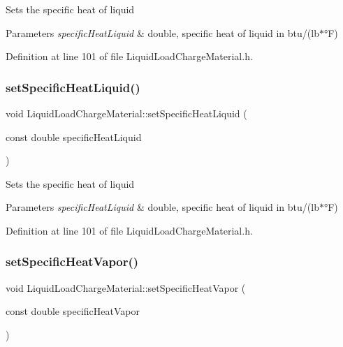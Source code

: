 Sets the specific heat of liquid 
\begin{DoxyParams}{Parameters}
{\em specific\+Heat\+Liquid} & double, specific heat of liquid in btu/(lb$\ast$°F) \\
\hline
\end{DoxyParams}


Definition at line 101 of file Liquid\+Load\+Charge\+Material.\+h.

\mbox{\label{class_liquid_load_charge_material_a2187c4c6ba394c05ab42e769bf175683}} 
\subsubsection{\texorpdfstring{set\+Specific\+Heat\+Liquid()}{setSpecificHeatLiquid()}\hspace{0.1cm}{\footnotesize\ttfamily [3/3]}}
{\footnotesize\ttfamily void Liquid\+Load\+Charge\+Material\+::set\+Specific\+Heat\+Liquid (\begin{DoxyParamCaption}\item[{const double}]{specific\+Heat\+Liquid }\end{DoxyParamCaption})\hspace{0.3cm}{\ttfamily [inline]}}

Sets the specific heat of liquid 
\begin{DoxyParams}{Parameters}
{\em specific\+Heat\+Liquid} & double, specific heat of liquid in btu/(lb$\ast$°F) \\
\hline
\end{DoxyParams}


Definition at line 101 of file Liquid\+Load\+Charge\+Material.\+h.

\mbox{\label{class_liquid_load_charge_material_ae95faf01cf6293ab282b1b7fe3b849e1}} 
\subsubsection{\texorpdfstring{set\+Specific\+Heat\+Vapor()}{setSpecificHeatVapor()}\hspace{0.1cm}{\footnotesize\ttfamily [1/3]}}
{\footnotesize\ttfamily void Liquid\+Load\+Charge\+Material\+::set\+Specific\+Heat\+Vapor (\begin{DoxyParamCaption}\item[{const double}]{specific\+Heat\+Vapor }\end{DoxyParamCaption})\hspace{0.3cm}{\ttfamily [inline]}}

